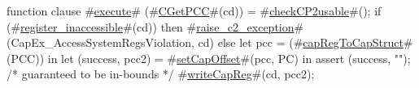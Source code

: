 function clause #\hyperref[zexecute]{execute}# (#\hyperref[zCGetPCC]{CGetPCC}#(cd)) =
{
  #\hyperref[zcheckCPtwousable]{checkCP2usable}#();
  if (#\hyperref[zregisterzyinaccessible]{register\_inaccessible}#(cd)) then
    #\hyperref[zraisezyctwozyexception]{raise\_c2\_exception}#(CapEx_AccessSystemRegsViolation, cd)
  else
    let pcc = (#\hyperref[zcapRegToCapStruct]{capRegToCapStruct}#(PCC)) in
    let (success, pcc2) = #\hyperref[zsetCapOffset]{setCapOffset}#(pcc, PC) in
    {assert (success, ""); /* guaranteed to be in-bounds */
    #\hyperref[zwriteCapReg]{writeCapReg}#(cd, pcc2)};
}
